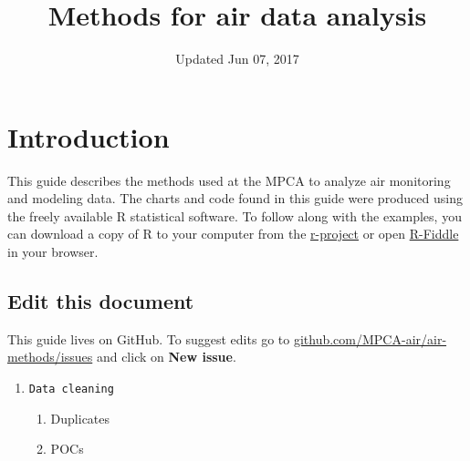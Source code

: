\documentclass[14pt,]{book}
\title{Methods for air data analysis}
\author{}
\date{Updated Jun 07, 2017}
\providecommand{\tightlist}{%
  \setlength{\itemsep}{0pt}\setlength{\parskip}{0pt}}
\theoremstyle{definition}
\theoremstyle{definition}
\theoremstyle{remark}
\begin{document}
\maketitle

{
\setcounter{tocdepth}{1}
\tableofcontents
}
\chapter*{Introduction}\label{introduction}

This guide describes the methods used at the MPCA to analyze air
monitoring and modeling data. The charts and code found in this guide
were produced using the freely available R statistical software. To
follow along with the examples, you can download a copy of R to your
computer from the \href{https://cran.r-project.org/}{r-project} or open
\href{http://www.r-fiddle.org/\#/}{R-Fiddle} in your browser.

\section*{Edit this document}\label{edit-this-document}

This guide lives on GitHub. To suggest edits go to
\href{https://github.com/MPCA-air/air-methods/issues}{github.com/MPCA-air/air-methods/issues}
and click on \textbf{New issue}.

\begin{enumerate}
\def\labelenumi{\arabic{enumi}.}
\setcounter{enumi}{-1}
\item
\begin{verbatim}
Data cleaning  
\end{verbatim}

  \begin{enumerate}
  \def\labelenumii{\alph{enumii}.}
  \tightlist
  \item
    Duplicates\\
  \item
    POCs
  \end{enumerate}
\end{enumerate}
\end{document}
